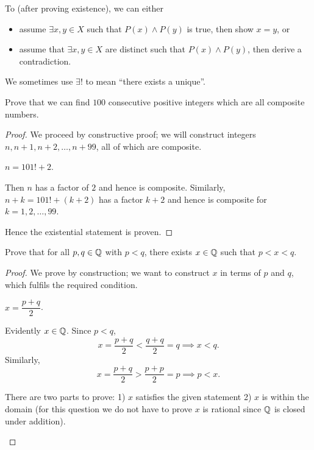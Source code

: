 To  (after proving existence), we can either
\begin{itemize}
\item assume $\exists x,y \in X$ such that $P(x)\land P(y)$ is true, then show $x=y$, or
\item assume that $\exists x,y \in X$ are distinct such that $P(x)\land P(y)$, then derive a contradiction.
\end{itemize}

We sometimes use $\exists!$ to mean ``there exists a unique''.

\begin{example}
Prove that we can find $100$ consecutive positive integers which are all composite numbers.

\begin{proof}
We proceed by constructive proof; we will construct integers $n,n+1,n+2,\dots,n+99$, all of which are composite.
\begin{claim}
$n=101!+2$.
\end{claim}
Then $n$ has a factor of $2$ and hence is composite. Similarly, $n+k=101!+(k+2)$ has a factor $k+2$ and hence is composite for $k=1,2,\dots,99$.

Hence the existential statement is proven.
\end{proof}
\end{example}

\begin{example}
Prove that for all $p,q\in\mathbb Q$ with $p<q$, there exists $x\in\mathbb Q$ such that $p<x<q$.
\begin{proof}
We prove by construction; we want to construct $x$ in terms of $p$ and $q$, which fulfils the required condition.
\begin{claim}
$x=\dfrac{p+q}{2}$.
\end{claim}
Evidently $x\in\mathbb Q$. Since $p<q$, 
\[x=\frac{p+q}{2}<\frac{q+q}{2}=q \implies x<q.\]
Similarly,
\[x=\frac{p+q}{2}>\frac{p+p}{2}=p \implies p<x.\]

\begin{remark}
There are two parts to prove: 1) $x$ satisfies the given statement 2) $x$ is within the domain (for this question we do not have to prove $x$ is rational since $\mathbb Q$ is closed under addition).
\end{remark}
\end{proof}
\end{example}

